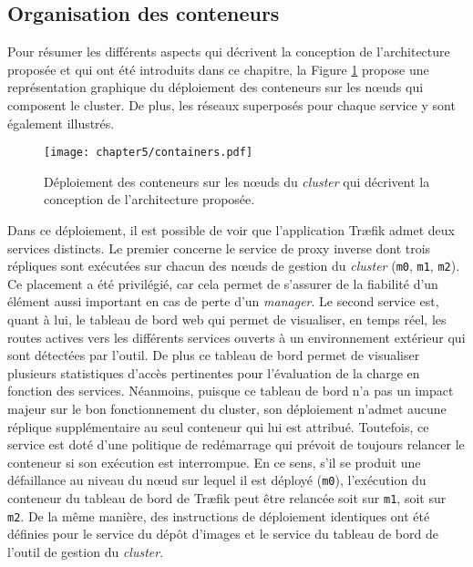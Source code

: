 \subsection{Organisation des conteneurs}
\label{sec:cont_org}

Pour résumer les différents aspects qui décrivent la conception de l'architecture proposée et qui ont été introduits dans ce chapitre, la Figure \ref{fig:containers} propose une représentation graphique du déploiement des conteneurs sur les n\oe{}uds qui composent le cluster. De plus, les réseaux superposés pour chaque service y sont également illustrés.

\begin{figure}[H]
	\centering
	\texttt{[image: chapter5/containers.pdf]}
        \caption{Déploiement des conteneurs sur les n\oe{}uds du \textit{cluster} qui décrivent la conception de l'architecture proposée.}
	\label{fig:containers}
\end{figure}

Dans ce déploiement, il est possible de voir que l'application Tr\ae{}fik admet deux services distincts. Le premier concerne le service de proxy inverse dont trois répliques sont exécutées sur chacun des n\oe{}uds de gestion du \textit{cluster} (\texttt{m0}, \texttt{m1}, \texttt{m2}). Ce placement a été privilégié, car cela permet de s'assurer de la fiabilité d'un élément aussi important en cas de perte d'un \textit{manager}. Le second service est, quant à lui, le tableau de bord web qui permet de visualiser, en temps réel, les routes actives vers les différents services ouverts à un environnement extérieur qui sont détectées par l'outil. De plus ce tableau de bord permet de visualiser plusieurs statistiques d'accès pertinentes pour l'évaluation de la charge en fonction des services. Néanmoins, puisque ce tableau de bord n'a pas un impact majeur sur le bon fonctionnement du cluster, son déploiement n'admet aucune réplique supplémentaire au seul conteneur qui lui est attribué. Toutefois, ce service est doté d'une politique de redémarrage qui prévoit de toujours relancer le conteneur si son exécution est interrompue. En ce sens, s'il se produit une défaillance au niveau du n\oe{}ud sur lequel il est déployé (\texttt{m0}), l'exécution du conteneur du tableau de bord de Tr\ae{}fik peut être relancée soit sur \texttt{m1}, soit sur \texttt{m2}. De la même manière, des instructions de déploiement identiques ont été définies pour le service du dépôt d'images et le service du tableau de bord de l'outil de gestion du \textit{cluster}.


